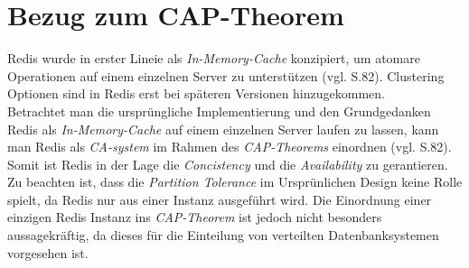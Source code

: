 
\section{Bezug zum CAP-Theorem}
\acs{Redis} wurde in erster Lineie als \textit{In-Memory-Cache} konzipiert, um atomare Operationen auf einem einzelnen Server zu unterstützen (vgl. \cite{nosql} S.82).
Clustering Optionen sind in Redis erst bei späteren Versionen hinzugekommen.
\\
Betrachtet man die ursprüngliche Implementierung und den Grundgedanken \acs{Redis} als \textit{In-Memory-Cache} auf einem einzelnen Server laufen zu lassen, kann man \acs{Redis} als \textit{CA-system} im Rahmen des \textit{CAP-Theorems} einordnen (vgl. \cite{nosql} S.82).
Somit ist Redis in der Lage die \textit{Concistency} und die \textit{Availability} zu gerantieren. Zu beachten ist, dass die \textit{Partition Tolerance} im Ursprünlichen Design keine Rolle spielt, da \acs{Redis} nur aus einer Instanz ausgeführt wird. 
Die Einordnung einer einzigen \acs{Redis} Instanz ins \textit{CAP-Theorem} ist jedoch nicht besonders aussagekräftig, da dieses für die Einteilung von verteilten Datenbanksystemen vorgesehen ist.

